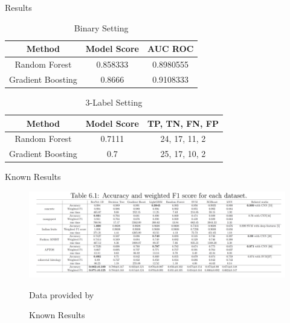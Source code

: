 \documentclass[11pt]{beamer}
\begin{document}
\begin{frame}{Results}
    \begin{table}
        \caption{Binary Setting}
        \label{tab:modelo_tabela}
        \centering
        \begin{tabular}{|c|c|c|}
	    \hline
	    \textbf{Method} & \textbf{Model Score} & \textbf{AUC ROC} \\ \hline
	    Random Forest & 0.858333 & 0.8980555  \\ \hline
	    Gradient Boosting & 0.8666 & 0.9108333   \\ \hline
        \end{tabular}
        
        \medskip
    \end{table}

    \begin{table}
        \caption{3-Label Setting}
        \label{tab:modelo_tabela}
        \centering
        \begin{tabular}{|c|c|c|}
	    \hline
            \textbf{Method} & \textbf{Model Score} & \textbf{TP, TN, FN, FP} \\ \hline
            Random Forest & 0.7111 & 24, 17, 11, 2    \\ \hline
            Gradient Boosting & 0.7 & 25, 17, 10, 2  \\ \hline
        \end{tabular}
        
        \medskip
    \end{table}
\end{frame}

\begin{frame}{Known Results}
    \begin{figure}
        \caption{Known Results}
 
        \centering
        \includegraphics[width=1\textwidth]{imagens/known_results.png}
        
        \medskip

        Data provided by \cite{knownresults}
    \end{figure}
\end{frame}
\end{document}
